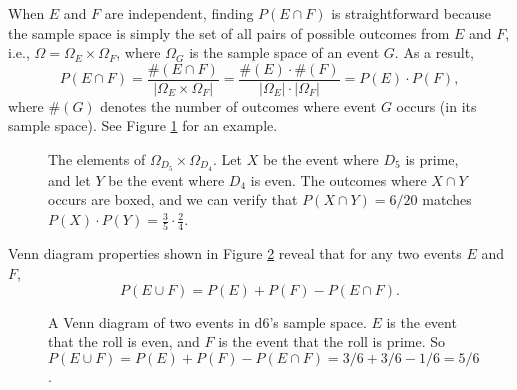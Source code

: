 \documentclass{book}
\begin{document}



\begin{exercise*}[\ref{q:cap}]
When $E$ and $F$ are independent, finding $P(E \cap F)$ is straightforward because the sample space is simply the set of all pairs of possible outcomes from $E$ and $F$, i.e., $\Omega = \Omega_E \times \Omega_F$, where $\Omega_G$ is the sample space of an event $G$. As a result,
\begin{equation*}
P(E \cap F) = \frac{\#(E \cap F)}{|\Omega_E \times \Omega_F|}
= \frac{\#(E) \cdot \#(F)}{|\Omega_E| \cdot |\Omega_F|}
= P(E) \cdot P(F),
\end{equation*} 
where $\#(G)$ denotes the number of outcomes where event $G$ occurs (in its sample space). See Figure \ref{product} for an example.
\end{exercise*}

\begin{figure}[ht]
\centering

\caption{The elements of $\Omega_{D_5} \times \Omega_{D_4}$. Let $X$ be the event where $D_5$ is prime, and let $Y$ be the event where $D_4$ is even. The outcomes where $X \cap Y$ occurs are boxed, and we can verify that $P(X \cap Y) = 6/20$ matches $P(X) \cdot P(Y) = \frac{3}{5} \cdot \frac{2}{4}$.}
\label{product}
\end{figure}


\begin{exercise*}[\ref{q:cup}]
Venn diagram properties shown in Figure \ref{vennd} reveal that for any two events $E$ and $F$, \[P(E \cup F) = P(E) + P(F) - P(E \cap F).\]
\end{exercise*}

\begin{figure}[ht]
\centering

\caption{A Venn diagram of two events in d6's sample space. $E$ is the event that the roll is even, and $F$ is the event that the roll is prime. So $P(E \cup F) = P(E) + P(F) - P(E \cap F) = 3/6 + 3/6 - 1/6 = 5/6$.}
\label{vennd}
\end{figure}
\end{document}
